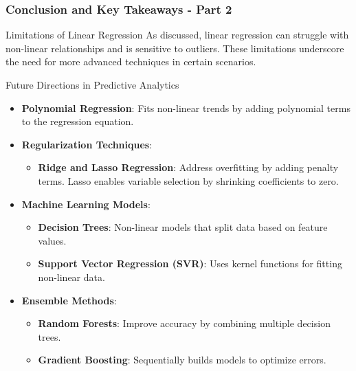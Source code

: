 \documentclass{beamer}
\begin{document}
\begin{frame}[fragile]
    \frametitle{Conclusion and Key Takeaways - Part 2}
    \begin{block}{Limitations of Linear Regression}
        As discussed, linear regression can struggle with non-linear relationships and is sensitive to outliers. 
        These limitations underscore the need for more advanced techniques in certain scenarios.
    \end{block}

    \begin{block}{Future Directions in Predictive Analytics}
        \begin{itemize}
            \item \textbf{Polynomial Regression}: Fits non-linear trends by adding polynomial terms to the regression equation.
            \item \textbf{Regularization Techniques}:
                \begin{itemize}
                    \item \textbf{Ridge and Lasso Regression}: Address overfitting by adding penalty terms. Lasso enables variable selection by shrinking coefficients to zero.
                \end{itemize}
            \item \textbf{Machine Learning Models}:
                \begin{itemize}
                    \item \textbf{Decision Trees}: Non-linear models that split data based on feature values.
                    \item \textbf{Support Vector Regression (SVR)}: Uses kernel functions for fitting non-linear data.
                \end{itemize}
            \item \textbf{Ensemble Methods}:
                \begin{itemize}
                    \item \textbf{Random Forests}: Improve accuracy by combining multiple decision trees.
                    \item \textbf{Gradient Boosting}: Sequentially builds models to optimize errors.
                \end{itemize}
        \end{itemize}
    \end{block}
\end{frame}
\end{document}
